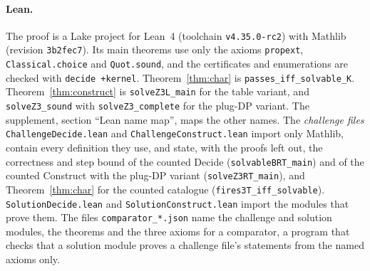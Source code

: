 \documentclass[11pt]{article}
\newcommand{\lean}[1]{\texttt{#1}}
\begin{document}
\paragraph{Lean.} The proof is a Lake project for Lean~4 (toolchain \lean{v4.35.0-rc2}) with
Mathlib (revision \lean{3b2fec7}). Its main theorems use only the axioms \lean{propext},
\lean{Classical.choice} and \lean{Quot.sound}, and the certificates and enumerations are checked
with \lean{decide +kernel}. Theorem~\ref{thm:char} is \lean{passes\_iff\_solvable\_K}.
Theorem~\ref{thm:construct} is \lean{solveZ3L\_main} for the table variant, and
\lean{solveZ3\_sound} with \lean{solveZ3\_complete} for the plug-DP variant. The supplement,
section ``Lean name map'', maps the other names. The \emph{challenge files}
\lean{ChallengeDecide.lean} and \lean{ChallengeConstruct.lean} import only Mathlib, contain every
definition they use, and state, with the proofs left out, the correctness and step bound of the
counted Decide (\lean{solvableBRT\_main}) and of the counted Construct with the plug-DP variant
(\lean{solveZ3RT\_main}), and Theorem~\ref{thm:char} for the counted catalogue
(\lean{fires3T\_iff\_solvable}). \lean{SolutionDecide.lean} and \lean{SolutionConstruct.lean}
import the modules that prove them. The files \lean{comparator\_*.json} name the challenge and solution
modules, the theorems and the three axioms for a comparator, a program that checks that a solution module
proves a challenge file's statements from the named axioms only.
\end{document}
